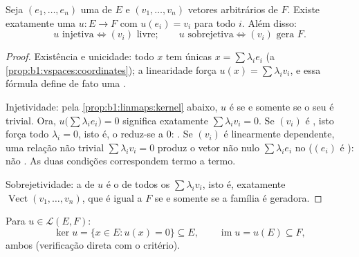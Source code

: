 \begin{proposition}\label{prop:b1:linmaps:basis}
Seja $(e_1, \dots, e_n)$ uma  de $E$ e $(v_1, \dots, v_n)$ vetores arbitrários de $F$.
Existe exatamente uma  $u \colon
E \to F$ com $u(e_i) = v_i$ para todo
$i$. Além disso:
\[
u \text{ injetiva} \iff (v_i) \text{ livre};
\qquad
u \text{ sobrejetiva} \iff (v_i) \text{ gera } F .
\]
\end{proposition}

\begin{proof}
Existência e unicidade: todo $x$ tem  únicas $x = \sum
\lambda_i e_i$
(a \cref{prop:b1:vspaces:coordinates}); a linearidade força $u(x) = \sum \lambda_i v_i$, e essa fórmula define de fato
uma .

Injetividade: pela \cref{prop:b1:linmaps:kernel} abaixo, $u$ é  se e somente se o
seu  é trivial. Ora, $u\bigl(\sum\lambda_i
e_i\bigr) = 0$ significa exatamente $\sum\lambda_i v_i = 0$. Se
$(v_i)$ é , isto força todo $\lambda_i = 0$, isto é, o  reduz-se a
$0$: . Se $(v_i)$ é linearmente dependente, uma relação não
trivial $\sum\lambda_i v_i = 0$ produz o vetor não nulo $\sum\lambda_i e_i$ no  ($(e_i)$ é
): não . As duas condições correspondem termo a termo.

Sobrejetividade: a  de $u$ é o  de todos os $\sum\lambda_i
v_i$,
isto é, exatamente $\operatorname{Vect}(v_1, \dots, v_n)$, que é igual a $F$ se e somente se a
família é geradora.
\end{proof}

\begin{definition}\label{def:b1:linmaps:kerim}
Para $u \in \mathcal{L}(E, F)$:
\[
\ker u = \{x \in E : u(x) = 0\} \subseteq E,
\qquad
\operatorname{im} u = u(E) \subseteq F ,
\]
ambos  (verificação direta com o
critério).
\end{definition}

